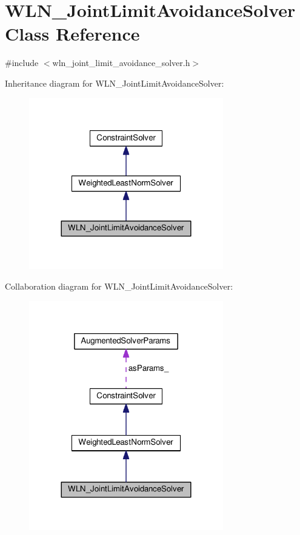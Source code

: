 \hypertarget{classWLN__JointLimitAvoidanceSolver}{\section{W\-L\-N\-\_\-\-Joint\-Limit\-Avoidance\-Solver Class Reference}
\label{classWLN__JointLimitAvoidanceSolver}
}


{\ttfamily \#include $<$wln\-\_\-joint\-\_\-limit\-\_\-avoidance\-\_\-solver.\-h$>$}



Inheritance diagram for W\-L\-N\-\_\-\-Joint\-Limit\-Avoidance\-Solver\-:
\nopagebreak
\begin{figure}[H]
\begin{center}
\leavevmode
\includegraphics[width=240pt]{classWLN__JointLimitAvoidanceSolver__inherit__graph}
\end{center}
\end{figure}


Collaboration diagram for W\-L\-N\-\_\-\-Joint\-Limit\-Avoidance\-Solver\-:
\nopagebreak
\begin{figure}[H]
\begin{center}
\leavevmode
\includegraphics[width=240pt]{classWLN__JointLimitAvoidanceSolver__coll__graph}
\end{center}
\end{figure}
